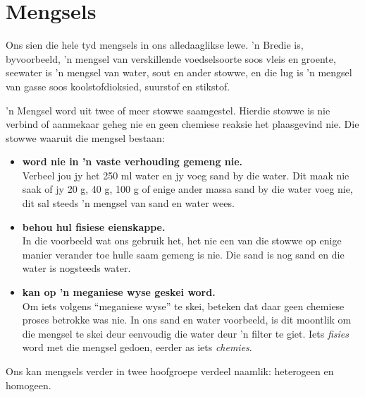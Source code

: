 \label{m38708*cid2}
            \section{Mengsels}
            \nopagebreak
            \label{m38708*id62584}Ons sien die hele tyd mengsels in ons alledaaglikse lewe. 'n Bredie is, byvoorbeeld, 'n mengsel van verskillende voedselsoorte soos vleis en groente, seewater is 'n mengsel van water, sout en ander stowwe, en die lug is 'n mengsel van gasse soos koolstofdioksied, suurstof en stikstof.\par 
\label{m38708*fhsst!!!underscore!!!id69}
 {\label{m38708*meaningfhsst!!!underscore!!!id69}
      'n Mengsel word uit twee of meer stowwe saamgestel. Hierdie stowwe is nie verbind of aanmekaar geheg nie en geen chemiese reaksie het plaasgevind nie.
       } 
      \label{m38708*id62612}Die stowwe waaruit die mengsel bestaan:\par 
      \label{m38708*id62615}\begin{itemize}[noitemsep]
            \label{m38708*uid2}\item \textbf{word nie in 'n vaste verhouding gemeng nie.} \\
Verbeel jou jy het 250 ml water en jy voeg sand by die water. Dit maak nie saak of jy 20 g, 40 g, 100 g of enige ander massa sand by die water voeg nie, dit sal steeds 'n mengsel van sand en water wees.
\label{m38708*uid3}\item \textbf{behou hul fisiese eienskappe.} \\
In die voorbeeld wat ons gebruik het, het nie een van die stowwe op enige manier verander toe hulle saam gemeng is nie. Die sand is nog sand en die water is nogsteeds water.
\label{m38708*uid4}\item \textbf{kan op 'n meganiese wyse geskei word.} \\
Om iets volgens ``meganiese wyse'' te skei, beteken dat daar geen chemiese proses betrokke was nie. In ons sand en water voorbeeld, is dit moontlik om die mengsel te skei deur eenvoudig die water deur 'n filter te giet. Iets \textsl{fisies} word met die mengsel gedoen, eerder as iets \textsl{chemies}.
\end{itemize}
      \label{m38708*id62700}Ons kan mengsels verder in twee hoofgroepe verdeel naamlik: heterogeen en homogeen.\par 

      \label{m38708*uid5}
